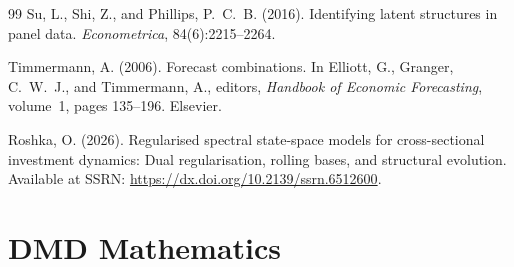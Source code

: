 \documentclass[11pt,a4paper]{article}
\begin{document}
\begin{thebibliography}{99}
Su, L., Shi, Z., and Phillips, P.~C.~B. (2016).
\newblock Identifying latent structures in panel data.
\newblock \emph{Econometrica}, 84(6):2215--2264.

Timmermann, A. (2006).
\newblock Forecast combinations.
\newblock In Elliott, G., Granger, C.~W.~J., and Timmermann, A., editors,
  \emph{Handbook of Economic Forecasting}, volume~1, pages 135--196. Elsevier.

Roshka, O. (2026).
\newblock Regularised spectral state-space models for cross-sectional investment dynamics: Dual regularisation, rolling bases, and structural evolution.
\newblock Available at SSRN: \url{https://dx.doi.org/10.2139/ssrn.6512600}.

\end{thebibliography}

\newpage
\appendix
\renewcommand{\thesection}{\Alph{section}}

\section{DMD Mathematics}
\label{app:dmd}
\end{document}
